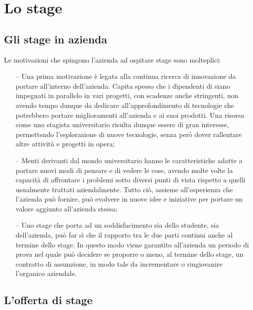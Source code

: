 

\chapter{Lo stage}
\label{cap:stage}

\section{Gli stage in azienda}

Le motivazioni che spingono l'azienda ad ospitare stage sono molteplici:

\begin{itemize}
	\item[--] {Una prima motivazione è legata alla continua ricerca di innovazione da portare all'interno dell'azienda. Capita spesso che i dipendenti di \nomeAzienda siano impegnati in parallelo in vari progetti, con scadenze anche stringenti, non avendo tempo dunque da dedicare all'approfondimento di tecnologie che potrebbero portare miglioramenti all'azienda e ai suoi prodotti. Una risorsa come uno stagista universitario risulta dunque essere di gran interesse, permettendo l'esplorazione di nuove tecnologie, senza però dover rallentare altre attività e progetti in opera;}

	\item[--] {Menti derivanti dal mondo universitario hanno le caratteristiche adatte a portare nuovi modi di pensare e di vedere le cose, avendo molte volte la capacità di affrontare i problemi sotto diversi punti di vista rispetto a quelli usualmente trattati aziendalmente. Tutto ciò, assieme all'esperienza che l'azienda può fornire, può evolvere in nuove idee e iniziative per portare un valore aggiunto all'azienda stessa;}
	
	\item[--] {Uno stage che porta ad un soddisfacimento sia dello studente, sia dell'azienda, può far sì che il rapporto tra le due parti continui anche al termine dello stage. In questo modo viene garantito all'azienda un periodo di prova nel quale può decidere se proporre o meno, al termine dello stage, un contratto di assunzione, in modo tale da incrementare o ringiovanire l'organico aziendale.}

\end{itemize}

\section{L'offerta di stage}


